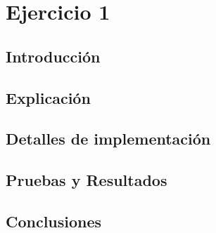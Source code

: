 \section {Ejercicio 1}
\subsection{Introducción}


\subsection{Explicación}


\subsection{Detalles de implementación}


\subsection{Pruebas y Resultados}


\subsection{Conclusiones}

